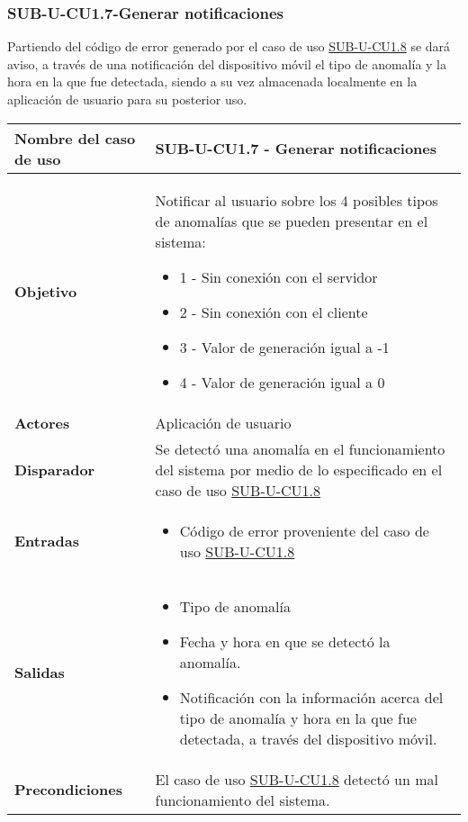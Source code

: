 \subsubsection{SUB-U-CU1.7-Generar notificaciones}\label{SUB-U-CU1.7}
Partiendo del código de error generado por el caso de uso \hyperref[SUB-U-CU1.8]{SUB-U-CU1.8} se dará aviso, a través de una notificación del dispositivo móvil el tipo de anomalía y la hora en la que fue detectada, siendo a su vez almacenada localmente en la aplicación de usuario para su posterior uso.  
\begin{longtable}{|J{5cm}|J{10.3cm}|}
	\hline
	\textbf{Nombre del caso de uso} &
		SUB-U-CU1.7 - Generar notificaciones
 \\ \hline
	\textbf{Objetivo} &
		Notificar al usuario sobre los 4 posibles tipos de anomalías que  se pueden presentar en el sistema:
		\begin{itemize}
			\item 1 - Sin conexión con el servidor
			\item 2 - Sin conexión con el cliente
			\item 3 - Valor de generación igual a -1
			\item 4 - Valor de generación igual a 0
		\end{itemize} \\ \hline
	\textbf{Actores} &
		Aplicación de usuario \\ \hline 
	\textbf{Disparador} & 
		Se detectó una anomalía en el funcionamiento del sistema por medio de lo especificado en el caso de uso \hyperref[SUB-U-CU1.8]{SUB-U-CU1.8}  \\ \hline
	\textbf{Entradas} & 
		\begin{itemize}
				\item Código de error proveniente del caso de uso \hyperref[SUB-U-CU1.8]{SUB-U-CU1.8}
		\end{itemize}\\ \hline 
	\textbf{Salidas} & 
		\begin{itemize}
		    \item Tipo de anomalía
			\item Fecha y hora en que se detectó la anomalía.
			\item Notificación con la información acerca del tipo de anomalía y hora en la que fue detectada, a través del dispositivo móvil.
		\end{itemize} \\ \hline
	\textbf{Precondiciones} &
		El caso de uso \hyperref[SUB-U-CU1.8]{SUB-U-CU1.8} detectó un mal funcionamiento del sistema.\\ \hline

\end{longtable}
